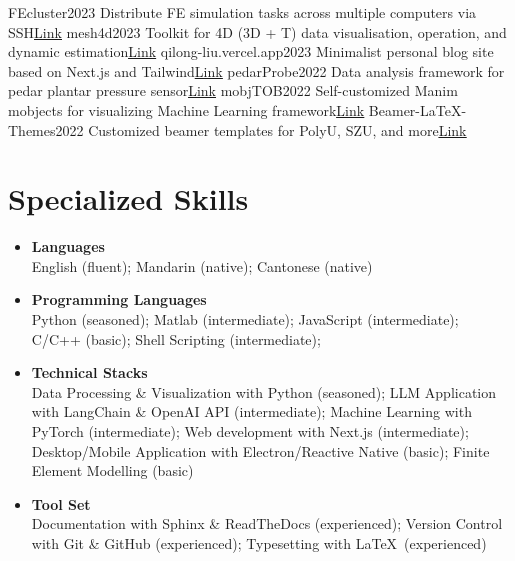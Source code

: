 \documentclass[letterpaper,11pt]{article}
\begin{document}
    \resumeSubHeadingListStart
        \resumeSubheading
            {FEcluster}{2023}
            {Distribute FE simulation tasks across multiple computers via SSH}{\href{https://github.com/liu-qilong/FEcluster}{\underline{Link}}}
        \resumeSubheading
            {mesh4d}{2023}
            {Toolkit for 4D (3D + T) data visualisation, operation, and dynamic estimation}{\href{https://github.com/liu-qilong/mesh4d}{\underline{Link}}}
        \resumeSubheading
            {qilong-liu.vercel.app}{2023}
            {Minimalist personal blog site based on Next.js and Tailwind}{\href{https://github.com/liu-qilong/qilong-liu}{\underline{Link}}}
        \resumeSubheading
            {pedarProbe}{2022}
            {Data analysis framework for pedar plantar pressure sensor}{\href{https://github.com/liu-qilong/pedarProbe}{\underline{Link}}}
        \resumeSubheading
            {mobjTOB}{2022}
            {Self-customized Manim mobjects for visualizing Machine Learning framework}{\href{https://github.com/liu-qilong/mobjTOB}{\underline{Link}}}
        \resumeSubheading
            {Beamer-LaTeX-Themes}{2022}
            {Customized beamer templates for PolyU, SZU, and more}{\href{https://github.com/liu-qilong/Beamer-LaTeX-Themes}{\underline{Link}}}
    \resumeSubHeadingListEnd

    \section{Specialized Skills}

    \begin{itemize}[leftmargin=0.15in, label={}, itemsep=0em]
        \item \textbf{Languages}\\
        English (fluent); Mandarin (native); Cantonese (native)
        \item \textbf{Programming Languages}\\
        Python (seasoned); Matlab (intermediate); JavaScript (intermediate); C/C++ (basic); Shell Scripting (intermediate);
        \item \textbf{Technical Stacks}\\
        Data Processing \& Visualization with Python (seasoned); LLM Application with LangChain \& OpenAI API (intermediate); Machine Learning with PyTorch (intermediate); Web development with Next.js (intermediate); Desktop/Mobile Application with Electron/Reactive Native (basic); Finite Element Modelling (basic)
        \item \textbf{Tool Set}\\
        Documentation with Sphinx \& ReadTheDocs (experienced); Version Control with Git \& GitHub (experienced); Typesetting with \LaTeX\ (experienced)
    \end{itemize}
\end{document}
